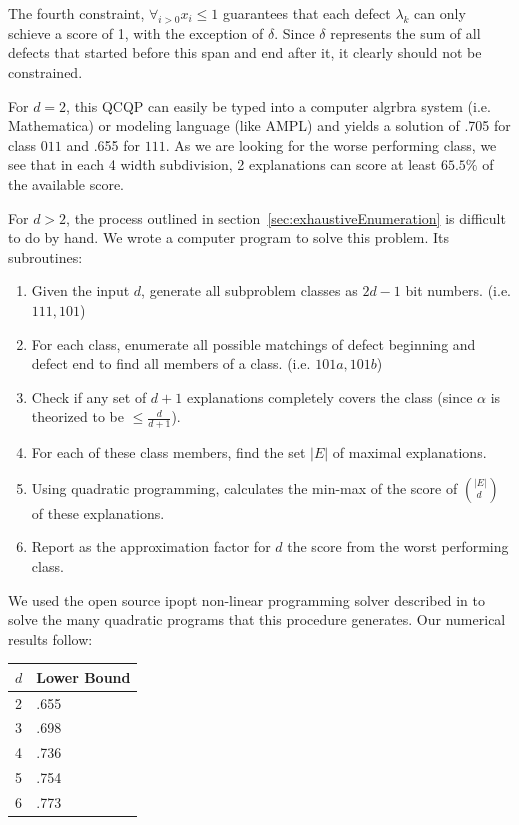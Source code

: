 The fourth constraint, $\forall_{i>0} x_i \leq 1$ guarantees that each defect $\lambda_k$ can only schieve a score of 1, with the exception of $\delta$. Since $\delta$ represents the sum of all defects that started before this span and end after it, it clearly should not be constrained.

For $d=2$, this QCQP can easily be typed into a computer algrbra system (i.e. Mathematica) or modeling language (like AMPL) and yields a solution of .705 for class $011$ and .655 for $111$.  As we are looking for the worse performing class, we see that in each 4 width subdivision, 2 explanations can score at least $65.5\%$ of the available score.

For $d > 2$, the process outlined in section~\ref{sec:exhaustiveEnumeration} is difficult to do by hand.  We wrote a computer program to solve this problem. Its subroutines:

\begin{enumerate}
\item Given the input $d$, generate all subproblem classes as $2d-1$ bit numbers.  (i.e. $111, 101$)
\item For each class, enumerate all possible matchings of defect beginning and defect end to find all members of a class. (i.e. $101a, 101b$)
\item Check if any set of $d+1$ explanations completely covers the class (since $\alpha$ is theorized to be $\leq \frac{d}{d+1}$).
\item For each of these class members, find the set $|E|$ of maximal explanations.  
\item Using quadratic programming, calculates the min-max of the score of $(^{|E|}_{\hspace{3pt}d})$ of these explanations.
\item Report as the approximation factor for $d$ the score from the worst performing class.
\end{enumerate}

We used the open source ipopt non-linear programming solver described in \cite{wachter2006implementation} to solve the many quadratic programs that this procedure generates.  Our numerical results follow:

\begin{tabular}{l|l}
$d$ & Lower Bound \\ \hline
2 & .655 \\ 
3 & .698 \\
4 & .736 \\
5 & .754 \\
6 & .773 \\
\end{tabular}

